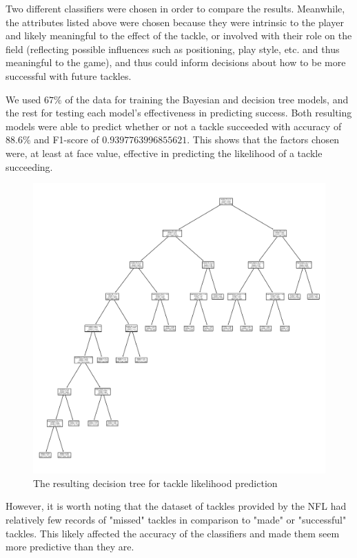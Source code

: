 \documentclass[bibtex, sigconf, hyperref={colorlinks=true,linkcolor=blue,urlcolor=blue}]{acmart}
\begin{document}
Two different classifiers were chosen in order to compare the results. Meanwhile,
the attributes listed above were chosen because they were intrinsic to the player
and likely meaningful to the effect of the tackle, or involved with their role on the field
(reflecting possible influences such as positioning, play style, etc. and thus
meaningful to the game), and thus could inform decisions about how to be more successful
with future tackles.

We used $67\%$ of the data for training the Bayesian and decision tree models, and the rest for
testing each model's effectiveness in predicting success. Both resulting models were able to
predict whether or not a tackle succeeded with accuracy of $88.6\%$ and F1-score
of $0.9397763996855621$. This shows that the factors chosen were, at least at face value, effective in
predicting the likelihood of a tackle succeeding.

\begin{figure}[h]
  \centering
  \includegraphics[width=\linewidth]
  {decision_tree.png}
  \caption{The resulting decision tree for tackle likelihood prediction}
\end{figure}

However, it is worth noting that the dataset of tackles provided by the NFL had relatively few records
of "missed" tackles in comparison to "made" or "successful" tackles. This likely affected the accuracy
of the classifiers and made them seem more predictive than they are.
\end{document}
